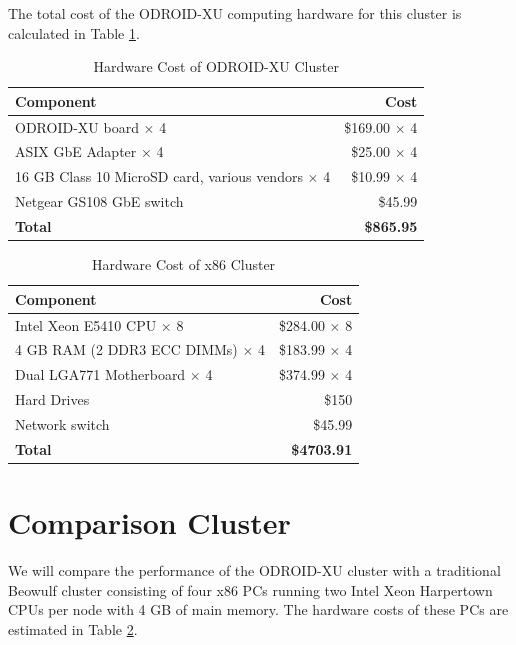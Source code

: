 \documentclass[11pt]{book}
\begin{document}
The total cost of the ODROID-XU computing hardware for this cluster is calculated in Table
\ref{xu-cost-table}.

\begin{table}
  \caption{Hardware Cost of ODROID-XU Cluster}\label{xu-cost-table}
  \centering
  \begin{tabular}{| l | r |}
    \hline
    \textbf{Component} & \textbf{Cost} \\ \hline
    ODROID-XU board $\times$ 4 & \$169.00 $\times$ 4 \\
    ASIX GbE Adapter $\times$ 4 & \$25.00 $\times$ 4 \\
    16 GB Class 10 MicroSD card, various vendors $\times$ 4 & \$10.99 $\times$ 4 \\
    Netgear GS108 GbE switch & \$45.99 \\
    \hline
    \textbf{Total} & \textbf{\$865.95} \\ \hline
  \end{tabular}
\end{table}

\begin{table}
  \caption{Hardware Cost of x86 Cluster}\label{x86-cost-table}
  \centering
  \begin{tabular}{| l | r |}
    \hline
    \textbf{Component} & \textbf{Cost} \\
    \hline
    Intel Xeon E5410 CPU $\times$ 8 & \$284.00 $\times$ 8 \\
    4 GB RAM (2 DDR3 ECC DIMMs) $\times$ 4 & \$183.99 $\times$ 4 \\
    Dual LGA771 Motherboard $\times$ 4 & \$374.99 $\times$ 4 \\
    Hard Drives & \$150 \\
    Network switch & \$45.99 \\
    \hline
    \textbf{Total} & \textbf{\$4703.91} \\ \hline
  \end{tabular}
\end{table}

\section{Comparison Cluster}

We will compare the performance of the ODROID-XU cluster with a traditional Beowulf
cluster consisting of four x86 PCs running two Intel Xeon Harpertown CPUs per node with 4
GB of main memory.  The hardware costs of these PCs are estimated in Table
\ref{x86-cost-table}.
\end{document}
